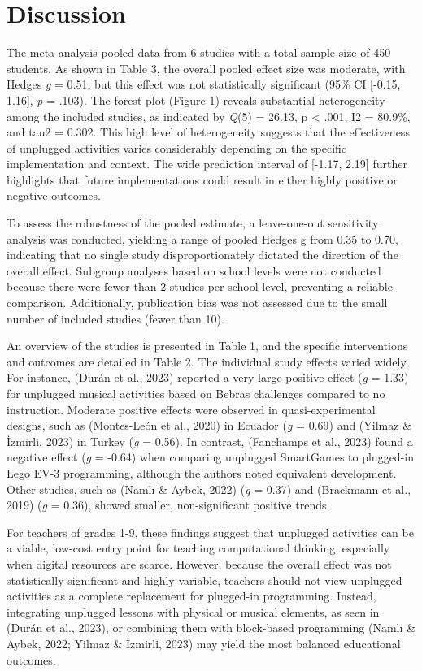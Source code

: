 \documentclass[man,a4paper,12pt,floatsintext,nolmodern,notab]{apa7}
\begin{document}
\section{Discussion}
The meta-analysis pooled data from 6 studies with a total sample size of 450 students. As shown in Table 3, the overall pooled effect size was moderate, with Hedges \textit{g} = 0.51, but this effect was not statistically significant (95\% CI [-0.15, 1.16], \textit{p} = .103). The forest plot (Figure 1) reveals substantial heterogeneity among the included studies, as indicated by \textit{Q}(5) = 26.13, p < .001, I2 = 80.9\%, and tau2 = 0.302. This high level of heterogeneity suggests that the effectiveness of unplugged activities varies considerably depending on the specific implementation and context. The wide prediction interval of [-1.17, 2.19] further highlights that future implementations could result in either highly positive or negative outcomes.

To assess the robustness of the pooled estimate, a leave-one-out sensitivity analysis was conducted, yielding a range of pooled Hedges g from 0.35 to 0.70, indicating that no single study disproportionately dictated the direction of the overall effect. Subgroup analyses based on school levels were not conducted because there were fewer than 2 studies per school level, preventing a reliable comparison. Additionally, publication bias was not assessed due to the small number of included studies (fewer than 10).

An overview of the studies is presented in Table 1, and the specific interventions and outcomes are detailed in Table 2. The individual study effects varied widely. For instance, (Durán et al., 2023) reported a very large positive effect (\textit{g} = 1.33) for unplugged musical activities based on Bebras challenges compared to no instruction. Moderate positive effects were observed in quasi-experimental designs, such as (Montes-León et al., 2020) in Ecuador (\textit{g} = 0.69) and (Yilmaz \& İzmirli, 2023) in Turkey (\textit{g} = 0.56). In contrast, (Fanchamps et al., 2023) found a negative effect (\textit{g} = -0.64) when comparing unplugged SmartGames to plugged-in Lego EV-3 programming, although the authors noted equivalent development. Other studies, such as (Namlı \& Aybek, 2022) (\textit{g} = 0.37) and (Brackmann et al., 2019) (\textit{g} = 0.36), showed smaller, non-significant positive trends.

For teachers of grades 1-9, these findings suggest that unplugged activities can be a viable, low-cost entry point for teaching computational thinking, especially when digital resources are scarce. However, because the overall effect was not statistically significant and highly variable, teachers should not view unplugged activities as a complete replacement for plugged-in programming. Instead, integrating unplugged lessons with physical or musical elements, as seen in (Durán et al., 2023), or combining them with block-based programming (Namlı \& Aybek, 2022; Yilmaz \& İzmirli, 2023) may yield the most balanced educational outcomes.
\end{document}
